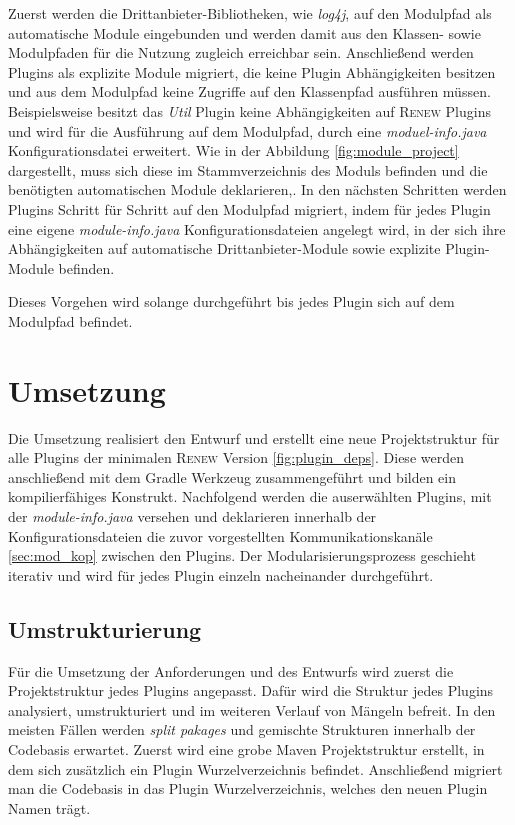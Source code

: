 	Zuerst werden die Drittanbieter-Bibliotheken, wie \textit{log4j}, auf den Modulpfad als automatische Module eingebunden und werden damit aus den Klassen- sowie Modulpfaden für die Nutzung zugleich erreichbar sein. Anschließend werden Plugins als explizite Module migriert, die keine Plugin Abhängigkeiten besitzen und aus dem Modulpfad keine Zugriffe auf den Klassenpfad ausführen müssen.   Beispielsweise besitzt das \textit{Util} Plugin keine Abhängigkeiten auf \textsc{Renew} Plugins und wird für die Ausführung auf dem Modulpfad, durch eine \textit{moduel-info.java} Konfigurationsdatei erweitert. Wie in der Abbildung \ref{fig:module_project} dargestellt, muss sich diese im Stammverzeichnis des Moduls befinden und die benötigten automatischen Module deklarieren,.\newline
	In den nächsten Schritten werden Plugins Schritt für Schritt auf den Modulpfad migriert, indem für jedes Plugin eine eigene \textit{module-info.java} Konfigurationsdateien angelegt wird, in der sich ihre Abhängigkeiten auf automatische Drittanbieter-Module sowie explizite Plugin-Module befinden.\bigbreak 

	Dieses Vorgehen wird solange durchgeführt bis jedes Plugin sich auf dem Modulpfad befindet. 

\section{Umsetzung}

	Die Umsetzung realisiert den Entwurf und erstellt eine neue Projektstruktur für alle Plugins der minimalen \textsc{Renew} Version \ref{fig:plugin_deps}. Diese werden anschließend mit dem Gradle Werkzeug zusammengeführt und bilden ein kompilierfähiges Konstrukt. Nachfolgend werden die auserwählten Plugins, mit der \textit{module-info.java} versehen und deklarieren innerhalb der Konfigurationsdateien die zuvor vorgestellten Kommunikationskanäle \ref{sec:mod_kop} zwischen den Plugins.\newline
	Der Modularisierungsprozess geschieht iterativ und wird für jedes Plugin einzeln nacheinander durchgeführt.
\newpage
\subsection{Umstrukturierung}

	Für die Umsetzung der Anforderungen und des Entwurfs wird zuerst die Projektstruktur jedes Plugins angepasst. Dafür wird die Struktur jedes Plugins analysiert, umstrukturiert und im weiteren Verlauf von Mängeln befreit. In den meisten Fällen werden \textit{split pakages} und gemischte Strukturen innerhalb der Codebasis erwartet.\bigbreak
	Zuerst wird eine grobe Maven Projektstruktur erstellt, in dem sich zusätzlich ein Plugin Wurzelverzeichnis befindet. Anschließend migriert man die Codebasis in das Plugin Wurzelverzeichnis, welches den neuen Plugin Namen trägt.

